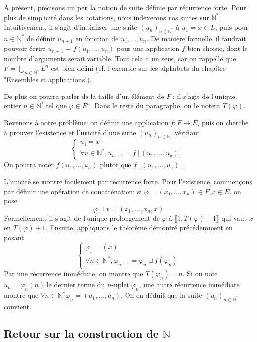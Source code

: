 \documentclass[french]{book}
\theoremstyle{plain}
\theoremstyle{definition}
\theoremstyle{remark}
\begin{document}
À présent, précisons un peu la notion de suite définie par récurrence forte. Pour plus de simplicité dans les notations, nous indexerons nos suites sur $\mathbb{N}^*$. Intuitivement, il s'agit d'initialiser une suite $(u_n)_{n \in \mathbb{N}^*}$ à $u_1 = x \in E$, puis pour $n \in \mathbb{N}^*$ de définir $u_{n+1}$ en fonction de $u_1, ..., u_n$. De manière formelle, il faudrait pouvoir écrire $u_{n+1} = f(u_1, ..., u_n)$ pour une application $f$ bien choisie, dont le nombre d'arguments serait variable. Tout cela a un sens, car on rappelle que $\displaystyle F = \bigcup_{n \in \mathbb{N}^*} E^n$ est bien défini (cf. l'exemple sur les alphabets du chapitre "Ensembles et applications"). \par 
De plus on pourra parler de la taille d'un élément de $F$ : il s'agit de l'unique entier $n \in \mathbb{N}^*$ tel que $\varphi \in E^n$. Dans le reste du paragraphe, on le notera $T(\varphi)$. \\ \par
Revenons à notre problème: on définit une application $f: F \rightarrow E$, puis on cherche à prouver l'existence et l'unicité d'une suite $(u_n)_{n \in \mathbb{N}^*}$ vérifiant $$
\begin{cases}
	u_1 = x \\
	\forall n \in \mathbb{N}^*, u_{n+1} = f[(u_1, ..., u_n)]
\end{cases}$$
On pourra noter $f(u_1, ..., u_n)$ plutôt que $f[(u_1, ..., u_n)]$. \par
L'unicité se montre facilement par récurrence forte. Pour l'existence, commençons par définir une opération de concaténation: si $\varphi = (x_1, ..., x_n) \in F, x \in E$, on pose $$\varphi \sqcup x = (x_1, ..., x_n, x)$$
Formellement, il s'agit de l'unique prolongement de $\varphi$ à $\llbracket1, T(\varphi) + 1\rrbracket$ qui vaut $x$ en $T(\varphi) + 1$. Ensuite, appliquons le théorème démontré précédemment en posant $$\begin{cases}
	\varphi_1 = (x) \\
	\forall n \in \mathbb{N}^*, \varphi_{n+1} = \varphi_n \sqcup f(\varphi_n)
\end{cases}$$
Par une récurrence immédiate, on montre que $T(\varphi_n) = n$. Si on note $u_n = \varphi_n(n)$ le dernier terme du $n$-uplet $\varphi_n$, une autre récurrence immédiate montre que $\forall n \in \mathbb{N}^* \varphi_n = (u_1, ..., u_n)$.
On en déduit que la suite $(u_n)_{n \in \mathbb{N}^*}$ convient.

\subsection{Retour sur la construction de $\mathbb{N}$}
\end{document}
